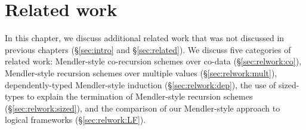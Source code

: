 \chapter{Related work}\label{ch:relwork}
In this chapter, we discuss additional related work that was not
discussed in previous chapters (\S\ref{sec:intro} and \S\ref{sec:related}).
We discuss five categories of related work:
Mendler-style co-recursion schemes over co-data (\S\ref{sec:relwork:co}),
Mendler-style recursion schemes over multiple values (\S\ref{sec:relwork:mult}),
dependently-typed Mendler-style induction (\S\ref{sec:relwork:dep}), 
the use of sized-types to explain the termination of Mendler-style
recursion schemes (\S\ref{sec:relwork:sized}), and the comparison of
our Mendler-style approach to logical frameworks (\S\ref{sec:relwork:LF}).




